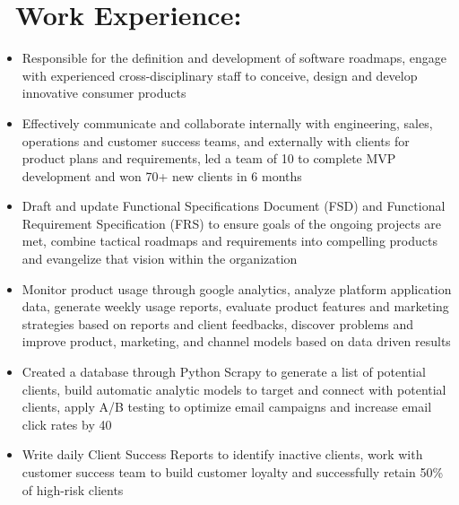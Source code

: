 \documentclass{resume}
\begin{document}
\section{%
        \texorpdfstring{\faUsers\ Work Experience:}%
                        {-{}--Work Experience}}
\begin{itemize}
  \item Responsible for the definition and development of software roadmaps, engage with experienced cross-disciplinary staff to conceive, design and develop innovative consumer products
  \item Effectively communicate and collaborate internally with engineering, sales, operations and customer success teams, and externally with clients for product plans and requirements, led a team of 10 to complete MVP development and won 70+ new clients in 6 months
  \item Draft and update Functional Specifications Document (FSD) and Functional Requirement Specification (FRS) to ensure goals of the ongoing projects are met, combine tactical roadmaps and requirements into compelling products and evangelize that vision within the organization
  \item Monitor product usage through google analytics, analyze platform application data, generate weekly usage reports, evaluate product features and marketing strategies based on reports and client feedbacks, discover problems and improve product, marketing, and channel models based on data driven results
  \item Created a database through Python Scrapy to generate a list of potential clients, build automatic analytic models to target and connect with potential clients, apply A/B testing to optimize email campaigns and increase email click rates by 40%
  \item Write daily Client Success Reports to identify inactive clients, work with customer success team to build customer loyalty and successfully retain 50\% of high-risk clients
\end{itemize}
\end{document}
